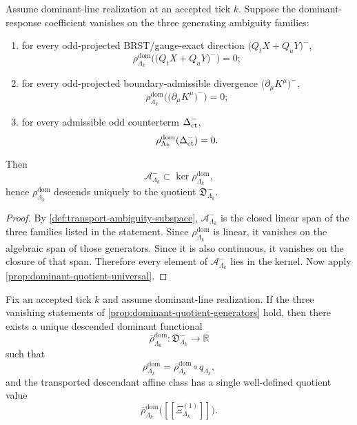 \documentclass[11pt]{article}
\begin{document}
\begin{proposition}
\label{prop:dominant-quotient-generators}
Assume dominant-line realization at an accepted tick \(k\).
Suppose the dominant-response coefficient vanishes on the three generating ambiguity families:
\begin{enumerate}[leftmargin=2em]
\item for every odd-projected BRST/gauge-exact direction \(\big(Q_tX+Q_uY\big)^-\),
  \[
  \rho^{\mathrm{dom}}_{\Lambda_k}\!\big(\big(Q_tX+Q_uY\big)^-\big)=0;
  \]
\item for every odd-projected boundary-admissible divergence \(\big(\partial_\mu K^\mu\big)^-\),
  \[
  \rho^{\mathrm{dom}}_{\Lambda_k}\!\big(\big(\partial_\mu K^\mu\big)^-\big)=0;
  \]
\item for every admissible odd counterterm \(\Delta^-_{\rm ct}\),
  \[
  \rho^{\mathrm{dom}}_{\Lambda_k}(\Delta^-_{\rm ct})=0.
  \]
\end{enumerate}
Then
\[
\mathcal A^-_{\Lambda_k}\subset\ker\rho^{\mathrm{dom}}_{\Lambda_k},
\]
hence \(\rho^{\mathrm{dom}}_{\Lambda_k}\) descends uniquely to the quotient
\(\mathfrak D^-_{\Lambda_k}\).
\end{proposition}

\begin{proof}
By \cref{def:transport-ambiguity-subspace}, \(\mathcal A^-_{\Lambda_k}\) is the closed linear span of
the three families listed in the statement. Since \(\rho^{\mathrm{dom}}_{\Lambda_k}\) is linear, it
vanishes on the algebraic span of those generators. Since it is also continuous, it vanishes on the
closure of that span. Therefore every element of \(\mathcal A^-_{\Lambda_k}\) lies in the kernel.
Now apply \cref{prop:dominant-quotient-universal}.
\end{proof}

\begin{theorem}
\label{thm:dominant-quotient-descent}
Fix an accepted tick \(k\) and assume dominant-line realization.
If the three vanishing statements of \cref{prop:dominant-quotient-generators} hold, then there
exists a unique descended dominant
functional
\[
\overline{\rho}^{\mathrm{dom}}_{\Lambda_k}:\mathfrak D^-_{\Lambda_k}\to\mathbb R
\]
such that
\[
\rho^{\mathrm{dom}}_{\Lambda_k}
=
\overline{\rho}^{\mathrm{dom}}_{\Lambda_k}\circ q_{\Lambda_k},
\]
and the transported descendant affine class has a single well-defined quotient value
\[
\overline{\rho}^{\mathrm{dom}}_{\Lambda_k}\big([\![\Xi^{(1)}_{\Lambda_k}]\!]\big).
\]
\end{theorem}
\end{document}
